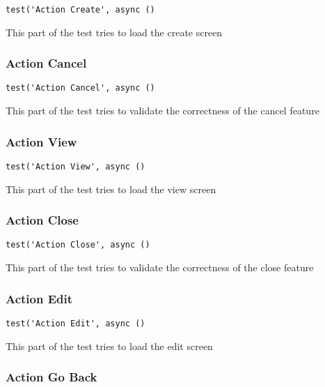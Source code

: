 \documentclass[a4paper]{article}
\begin{document}
\begin{lstlisting}
test('Action Create', async ()
\end{lstlisting}

This part of the test tries to load the create screen

\hypertarget{toc557}{}
\subsubsection{Action Cancel}

\begin{lstlisting}
test('Action Cancel', async ()
\end{lstlisting}

This part of the test tries to validate the correctness of the cancel feature

\hypertarget{toc558}{}
\subsubsection{Action View}

\begin{lstlisting}
test('Action View', async ()
\end{lstlisting}

This part of the test tries to load the view screen

\hypertarget{toc559}{}
\subsubsection{Action Close}

\begin{lstlisting}
test('Action Close', async ()
\end{lstlisting}

This part of the test tries to validate the correctness of the close feature

\hypertarget{toc560}{}
\subsubsection{Action Edit}

\begin{lstlisting}
test('Action Edit', async ()
\end{lstlisting}

This part of the test tries to load the edit screen

\hypertarget{toc561}{}
\subsubsection{Action Go Back}
\end{document}
